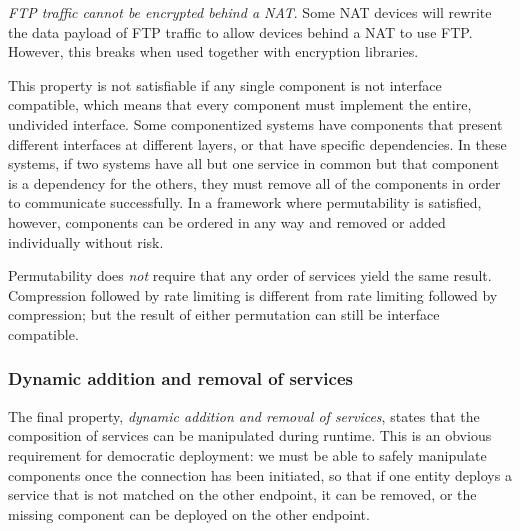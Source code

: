 \emph{FTP traffic cannot be encrypted behind a NAT}.
Some NAT devices will rewrite the data payload of FTP traffic 
to allow devices behind a NAT to use FTP. However, this breaks when used together 
with encryption libraries.



This property is not satisfiable if any single component
is not interface compatible, which means that every 
component must implement the entire, undivided interface. 
Some componentized systems have components that present different 
interfaces at different layers, or that have specific dependencies. 
In these systems, if two systems have all but one service 
in common but that component is a dependency for the others, 
they must remove all of the components in order to communicate 
successfully. 
In a framework where permutability is satisfied, however,
components can be ordered in any way 
and removed or added individually without risk.



Permutability does \textit{not} require that any order of services
yield the same result. Compression followed by rate limiting
is different from rate limiting followed by compression; 
but the result of either 
permutation can still be interface compatible.



\subsubsection{Dynamic addition and removal of services}

The final property, 
\textit{dynamic addition and removal of services}, 
states that the composition of services   
can be manipulated during runtime. 
This is an obvious requirement for democratic deployment:
we must be able to safely manipulate components once the connection 
has been initiated, so that if one entity deploys a 
service that is not matched on the other endpoint, 
it can be removed, or the missing component can be 
deployed on the other endpoint.



